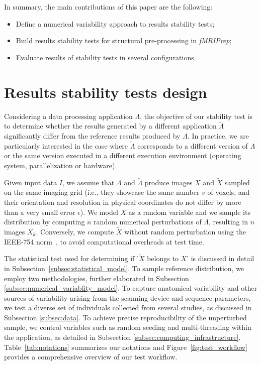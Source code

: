 \documentclass[lettersize,journal]{IEEEtran}
\newcommand{\fmriprep}{\emph{fMRIPrep}\xspace}
\begin{document}
{In summary, the main contributions of this paper are the following:
\begin{itemize}
  \item Define a numerical variability approach to results stability tests;
  \item Build results stability tests for structural pre-processing in \fmriprep;
  \item Evaluate results of stability tests in several configurations.
\end{itemize}

\section{Results stability tests design}

Considering a data processing application $\Lambda$, the objective of our stability test is to determine whether the results generated by a different application $\tilde \Lambda$ significantly differ from the reference results produced by $\Lambda$. In practice, we are particularly interested in the case where $\tilde \Lambda$ corresponds to a different version of $\Lambda$ or the same version executed in a different execution environment (operating system, parallelization or hardware).

Given input data $I$, we assume that $\Lambda$ and $\tilde \Lambda$ produce images $X$ and $\tilde X$ sampled on the same imaging grid (i.e., they showcase the same number $v$ of voxels, and their orientation and resolution in physical coordinates do not differ by more than a very small error $\epsilon$).
We model $X$ as a random variable and we sample its distribution by computing $n$ random numerical perturbations of $\Lambda$, resulting in $n$ images $X_k$. Conversely, we compute $\tilde X$ without random perturbation using the IEEE-754 norm~\cite{ieee754}, to avoid computational overheads at test time.

The statistical test used for determining if '$\tilde X$ belongs to $X$' is discussed in detail in Subsection~\ref{subsec:statistical_model}. To sample reference distribution, we employ two methodologies, further elaborated in Subsection \ref{subsec:numerical_variablity_model}.
To capture anatomical variability and other sources of variability arising from the scanning device and sequence parameters, we test a diverse set of individuals collected from several studies, as discussed in Subsection \ref{subsec:data}.
To achieve precise reproducibility of the unperturbed sample, we control variables such as random seeding and multi-threading within the application, as detailed in Subsection \ref{subsec:computing_infrastructure}.
Table~\ref{tab:notations} summarizes our notations and Figure~\ref{fig:test_workflow} provides a comprehensive overview of our test workflow.


}
\end{document}
